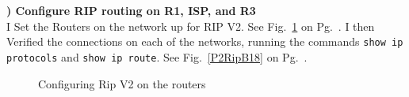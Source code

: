 \documentclass{report}
\newcommand{\mysubsection}[2]{\textbf{\romannumeral #1) #2}}
\begin{document}
\clearpage

\noindent\mysubsection{3}{Configure RIP routing on R1, ISP, and R3}\\
I Set the Routers on the network up for RIP V2. See Fig.~\ref{P2RipA18} on
Pg.~\pageref{P2RipA18}.
I then Verified the connections on each of the networks, running the commands
{\scriptsize{\verb$show ip protocols$}\normalsize} and
{\scriptsize{\verb$show ip route$}\normalsize}. See Fig.~\ref{P2RipB18} on
Pg.~\pageref{P2RipB18}.


\begin{figure}[!hbt]\centering
{}\hfill
{}\par 
{}
\caption{Configuring Rip V2 on the routers}
\label{P2RipA18}
\end{figure}
\end{document}
